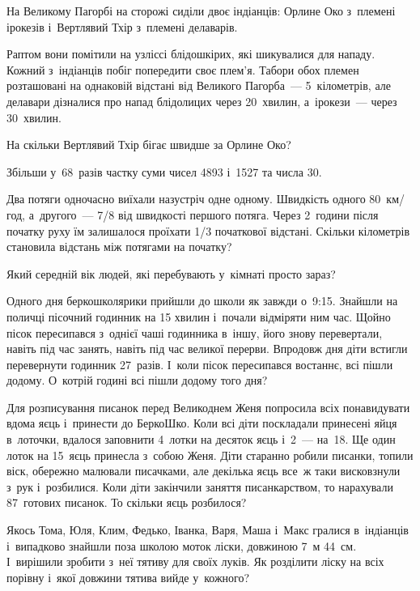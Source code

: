 \problem
На Великому Пагорбі на сторожі сиділи двоє індіанців:
Орлине Око з~племені ірокезів і~Вертлявий Тхір з~племені делаварів.

Раптом вони помітили на узліссі блідошкірих, які шикувалися для нападу.
Кожний з~індіанців побіг попередити своє плем’я.
Табори обох племен розташовані на однаковій відстані від Великого Пагорба~---
5~кілометрів, але делавари дізналися про напад блідолицих через 20~хвилин,
а~ірокези~--- через 30~хвилин.

На скільки Вертлявий Тхір бігає швидше за Орлине Око?


\problem
Збільши у~68~разів частку суми чисел 4893 і~1527 та числа 30.


\problem
Два потяги одночасно виїхали назустріч одне одному.
Швидкість одного 80~км/год, а~другого~--- 7/8 від швидкості першого потяга.
Через 2~години після початку руху їм залишалося проїхати
1/3 початкової відстані.
Скільки кілометрів становила відстань між потягами на початку?


\problem
Який середній вік людей, які перебувають у~кімнаті просто зараз?


\problem
Одного дня беркошколярики прийшли до школи як завжди о~9:15.
Знайшли на поличці пісочний годинник на 15 хвилин і~почали відміряти ним час.
Щойно пісок пересипався з~однієї чаші годинника в~іншу,
його знову перевертали, навіть під час занять,
навіть під час великої перерви.
Впродовж дня діти встигли перевернути годинник 27~разів.
І~коли пісок пересипався востаннє, всі пішли додому.
О~котрій годині всі пішли додому того дня?


\problem
Для розписування писанок перед Великоднем Женя попросила всіх понавидувати
вдома яєць і~принести до БеркоШко. Коли всі діти поскладали принесені яйця
в~лоточки, вдалося заповнити 4~лотки на десяток яєць і~2~--- на~18.
Ще один лоток на 15~яєць принесла з~собою Женя.
Діти старанно робили писанки, топили віск, обережно малювали писачками,
але декілька яєць все~ж таки висковзнули з~рук і~розбилися.
Коли діти закінчили заняття писанкарством, то нарахували 87~готових писанок.
То скільки яєць розбилося?


\problem
Якось Тома, Юля, Клим, Федько, Іванка, Варя, Маша і~Макс гралися
в~індіанців і~випадково знайшли поза школою моток ліски, довжиною 7~м 44~см.
І~вирішили зробити з~неї тятиву для своїх луків.
Як розділити ліску на всіх порівну і~якої довжини тятива вийде у~кожного?
